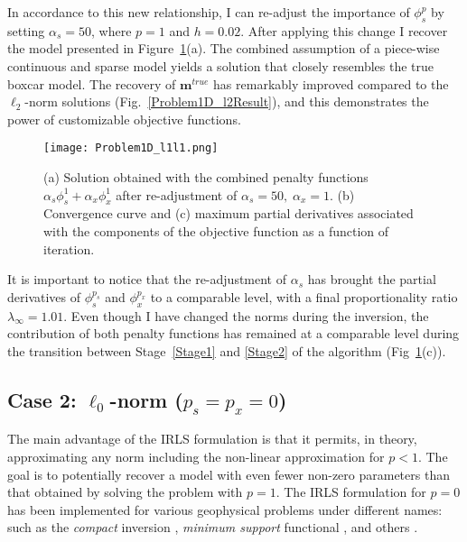 In accordance to this new relationship, I can re-adjust the importance of $\phi_s^p$ by setting $\alpha_s=50$, where $p=1$ and $h=0.02$.
After applying this change I recover the model presented in Figure~\ref{Problem1D_l1l1}(a). The combined assumption of a piece-wise continuous and sparse model yields a solution that closely resembles the true boxcar model. The recovery of $\mathbf{m}^{true}$ has remarkably improved compared to the $\ell_2$-norm solutions (Fig.~\ref{Problem1D_l2Result}), and this demonstrates the power of customizable objective functions.
\begin{figure}
\texttt{[image: Problem1D\_l1l1.png]}
\caption{(a) Solution obtained with the combined penalty functions $\alpha_s \phi_s^1 + \alpha_x \phi_x^1$ after re-adjustment of $\alpha_s=50,\;\alpha_x = 1$. (b) Convergence curve and (c) maximum partial derivatives associated with the components of the objective function as a function of iteration.}
\label{Problem1D_l1l1}
\end{figure}
It is important to notice that the re-adjustment of $\alpha_s$ has brought the partial derivatives of $\phi_s^{p_s}$ and $\phi_x^{p_x}$ to a comparable level, with a final proportionality ratio $\lambda_\infty=1.01$. Even though I have changed the norms during the inversion, the contribution of both penalty functions has remained at a comparable level during the transition between Stage~\ref{Stage1} and \ref{Stage2} of the algorithm (Fig~\ref{Problem1D_l1l1}(c)).


\subsection{Case 2: $\ell_0$-norm ($p_s=p_x=0$)}
The main advantage of the IRLS formulation is that it permits, in theory, approximating any norm including the non-linear approximation for $p < 1$. The goal is to potentially recover a model with even fewer non-zero parameters than that obtained by solving the problem with $p=1$.
The IRLS formulation for $p=0$ has been implemented for various geophysical problems under different names: such as the \textit{compact} inversion \cite[]{LastKubik83}, \textit{minimum support} functional \cite[]{PortniaguineZhdanov02}, and others \cite[]{BarbosaSilva94, Chartrand07, Ajo-Franklin07, Blaschek2008, Stocco09}.


